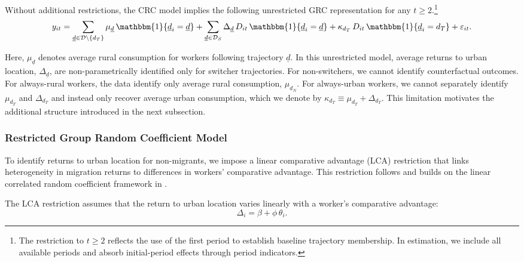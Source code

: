 \documentclass[12pt]{article}
\begin{document}
Without additional restrictions, the CRC model implies the following unrestricted GRC representation for any $t \ge 2$.\footnote{The restriction to $t \ge 2$ reflects the use of the first period to establish baseline trajectory membership. In estimation, we include all available periods and absorb initial-period effects through period indicators.}
\begin{equation}\label{eq:unrestricted-grc-model}
    y_{it}= \sum_{\underline d \in \mathcal D \setminus \{d_T\}}
    \mu_{\underline d}\,\mathbbm{1}\{ \underline d_i=\underline d \} + \sum_{\underline d \in \mathcal D_S}
    \Delta_{\underline d}\, D_{it}\,\mathbbm{1}\{ \underline d_i=\underline d \} + \kappa_{d_T}\, D_{it}\,\mathbbm{1}\{ \underline d_i=d_T \} + \varepsilon_{it}.
\end{equation}

Here, $\mu_{\underline d}$ denotes average rural consumption for workers following trajectory $\underline d$.
In this unrestricted model, average returns to urban location, $\Delta_{\underline d}$, are non-parametrically identified only for switcher trajectories.
For non-switchers, we cannot identify counterfactual outcomes. 
For always-rural workers, the data identify only average rural consumption, $\mu_{d_N}$.
For always-urban workers, we cannot separately identify $\mu_{d_T}$ and $\Delta_{d_T}$ and instead only recover average urban consumption, which we denote by $\kappa_{d_T} \equiv \mu_{d_T} + \Delta_{d_T}$.
This limitation motivates the additional structure introduced in the next subsection.

\subsubsection{Restricted Group Random Coefficient Model}\label{subsec:restricted-grc-model}

To identify returns to urban location for non-migrants, we impose a linear comparative advantage (LCA) restriction that links heterogeneity in migration returns to differences in workers' comparative advantage.
This restriction follows \cite{suriSelectionComparativeAdvantage2011} and builds on the linear correlated random coefficient framework in \cite{lemieuxEstimatingEffectsUnions1998}.

The LCA restriction assumes that the return to urban location varies linearly with a worker's comparative advantage:
\begin{equation}\label{eq:LCA-restriction}
\Delta_i = \beta + \phi\,\theta_i .
\end{equation}
\end{document}
